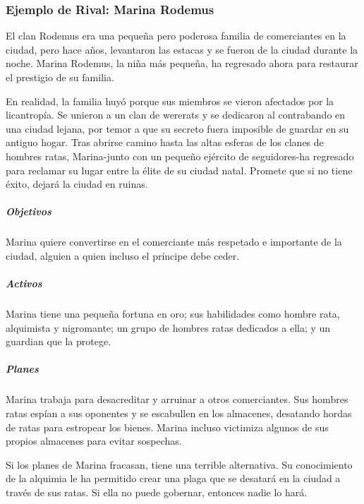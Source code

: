 \documentclass[a4paper,twocolumn,openany,10pt]{dndbook}
\begin{document}
\subsubsection*{Ejemplo de Rival: Marina Rodemus}
El clan Rodemus era una pequeña pero poderosa familia de comerciantes en la ciudad, pero hace años, levantaron las estacas y se
fueron de la ciudad durante la noche. Marina Rodemus, la niña más pequeña, ha regresado ahora para restaurar el prestigio de su
familia.

En realidad, la familia huyó porque sus miembros se vieron afectados por la licantropía. Se unieron a un clan de wererats y se
dedicaron al contrabando en una ciudad lejana, por temor a que su secreto fuera imposible de guardar en su antiguo hogar. Tras
abrirse camino hasta las altas esferas de los clanes de hombres ratas, Marina-junto con un pequeño ejército de seguidores-ha
regresado para reclamar su lugar entre la élite de su ciudad natal. Promete que si no tiene éxito, dejará la ciudad en ruinas.

\subparagraph{Objetivos} Marina quiere convertirse en el comerciante más respetado e importante de la ciudad, alguien a quien
incluso el príncipe debe ceder.

\subparagraph{Activos} Marina tiene una pequeña fortuna en oro; sus habilidades como hombre rata, alquimista y nigromante; un
grupo de hombres ratas dedicados a ella; y un guardian que la protege.

\subparagraph{Planes} Marina trabaja para desacreditar y arruinar a otros comerciantes. Sus hombres ratas espían a sus oponentes
y se escabullen en los almacenes, desatando hordas de ratas para estropear los bienes. Marina incluso victimiza algunos de sus
propios almacenes para evitar sospechas.

Si los planes de Marina fracasan, tiene una terrible alternativa. Su conocimiento de la alquimia le ha permitido crear una plaga
que se desatará en la ciudad a través de sus ratas. Si ella no puede gobernar, entonces nadie lo hará. 
\end{document}

